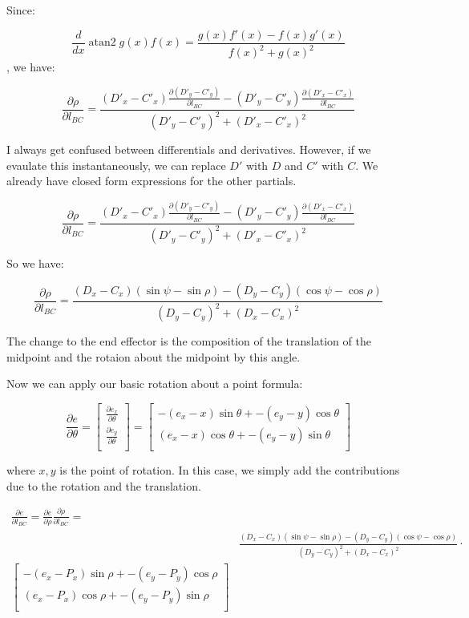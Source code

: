 \documentclass[11pt]{article}
\DeclareMathOperator{\atantwo}{atan2}
\begin{document}
 Since:

 \[
 \frac{d}{dx} \atantwo{g(x)}{f(x)} = \frac{g(x)f'(x) - f(x)g'(x)}{f(x)^2 + g(x)^2}
 \]
 , we have:

 
 
\[
\frac{\partial \rho}{ \partial l_{BC}} = \frac{ (D'_x - C'_x)\frac{\partial (D'_y - C'_y)}{\partial l_{BC}}
  - (D'_y - C'_y)\frac{\partial (D'_x - C'_x)}{\partial l_{BC}}
}
  {(D'_y - C'_y)^2 + (D'_x - C'_x)^2}
  \]

  I always get confused between differentials and derivatives.  However, if we evaulate this instantaneously,
  we can replace $D'$ with $D$ and $C'$ with $C$. We already have closed form expressions for the other partials.

  \[
\frac{\partial \rho}{ \partial l_{BC}} = \frac{ (D'_x - C'_x)\frac{\partial (D'_y - C'_y)}{\partial l_{BC}}
  - (D'_y - C'_y)\frac{\partial (D'_x - C'_x)}{\partial l_{BC}}
}
  {(D'_y - C'_y)^2 + (D'_x - C'_x)^2}
  \]

  So we have:
  
    \[
    \frac{\partial \rho}{ \partial l_{BC}} = \frac{ (D_x - C_x)(\sin{\psi} -\sin{\rho})
      - (D_y - C_y)(\cos{\psi} - \cos{\rho})}
  {(D_y - C_y)^2 + (D_x - C_x)^2}
  \]

  The change to the end effector is the composition of the translation of the midpoint and
  the rotaion about the midpoint by this angle.

  Now we can apply our basic rotation about a point formula:

  
\[
\frac{\partial e}{\partial \theta} = \begin{bmatrix}
           \frac{\partial e_x}{\partial \theta} \\
           \frac{\partial e_y}{\partial \theta} \\
         \end{bmatrix} = \begin{bmatrix}
           -(e_x  - x) \sin{\theta} + -(e_y -y)\cos{\theta}  \\
           (e_x - x ) \cos{\theta} + -(e_y - y)\sin{\theta}  \\
         \end{bmatrix}
\]

where $x,y$ is the point of rotation. In this case, we simply add the contributions due to the rotation
and the translation.

\begin{equation} \label{eq1}
\begin{split}
\frac{\partial e}{\partial l_{BC}} = 
\frac{\partial e}{\partial \rho} \frac{\partial \rho}{ \partial l_{BC}} = & \\
 & \frac{ (D_x - C_x)(\sin{\psi} -\sin{\rho})
      - (D_y - C_y)(\cos{\psi} - \cos{\rho})}
  {(D_y - C_y)^2 + (D_x - C_x)^2} \cdot \\
\begin{bmatrix}
           -(e_x  - P_x) \sin{\rho} + -(e_y - P_y)\cos{\rho}  \\
           (e_x - P_x ) \cos{\rho} + -(e_y - P_y)\sin{\rho}  \\
         \end{bmatrix}
\end{split}
\end{equation}
\end{document}
